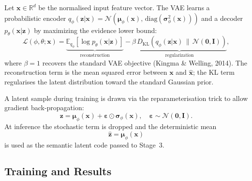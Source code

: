 \documentclass[12pt,a4paper]{article}
\begin{document}
Let $\mathbf{x}\in\mathbb{R}^d$ be the normalised input feature vector.
The VAE learns a probabilistic encoder
$q_\phi(\mathbf{z}|\mathbf{x}) = \mathcal{N}(\bm{\mu}_\phi(\mathbf{x}),\,
\mathrm{diag}(\bm{\sigma}^2_\phi(\mathbf{x})))$
and a decoder $p_\theta(\mathbf{x}|\mathbf{z})$ by maximizing the
evidence lower bound:
\begin{equation}
\mathcal{L}(\phi,\theta;\mathbf{x})
  = \underbrace{\mathbb{E}_{q_\phi}\!\left[\log p_\theta(\mathbf{x}|\mathbf{z})\right]}_{\text{reconstruction}}
  - \underbrace{\beta\, D_{\mathrm{KL}}\!\left(q_\phi(\mathbf{z}|\mathbf{x})\,\|\,
    \mathcal{N}(\mathbf{0},\mathbf{I})\right)}_{\text{regularization}},
\label{eq:elbo}
\end{equation}
where $\beta=1$ recovers the standard VAE objective (Kingma \& Welling, 2014). The reconstruction term is the mean
squared error between $\mathbf{x}$ and $\hat{\mathbf{x}}$; the KL term
regularises the latent distribution toward the standard Gaussian prior.

A latent sample during training is drawn via the reparameterisation trick
to allow gradient back-propagation:
\begin{equation}
\mathbf{z} = \bm{\mu}_\phi(\mathbf{x})
           + \bm{\varepsilon}\odot\bm{\sigma}_\phi(\mathbf{x}),
\quad \bm{\varepsilon}\sim\mathcal{N}(\mathbf{0},\mathbf{I}).
\label{eq:reparam}
\end{equation}
At inference the stochastic term is dropped and the deterministic mean
\begin{equation}
\hat{\mathbf{z}} = \bm{\mu}_\phi(\mathbf{x})
\label{eq:latent}
\end{equation}
is used as the semantic latent code passed to Stage~3.

\subsection{Training and Results}
\end{document}
